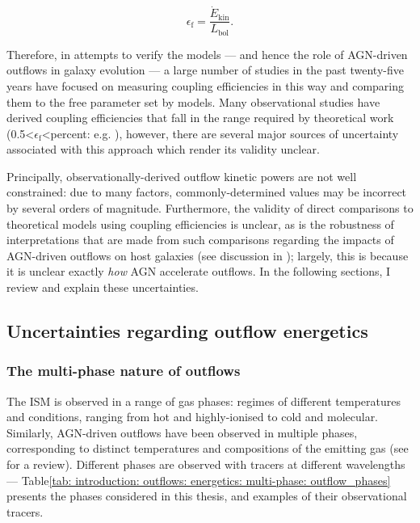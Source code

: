 \begin{equation}
    \epsilon_\mathrm{f}=\frac{\dot{E}_\mathrm{kin}}{L_\mathrm{bol}}.
    \label{eq: introduction: outflows: introduction: e_f}
\end{equation}

Therefore, in attempts to verify the models --- and hence the role of AGN-driven outflows in galaxy evolution --- a large number of studies in the past twenty-five years have focused on measuring coupling efficiencies in this way and comparing them to the free parameter set by models. Many observational studies have derived coupling efficiencies that fall in the range required by theoretical work (0.5\;\textless\;$\epsilon_\mathrm{f}$\;\textless{}\;per\;cent: e.g. \citealt{Liu2013, Harrison2014, Cicone2014, Fiore2017}), however, there are several major sources of uncertainty associated with this approach which render its validity unclear.

Principally, observationally-derived outflow kinetic powers are not well constrained: due to many factors, commonly-determined values may be incorrect by several orders of magnitude. Furthermore, the validity of direct comparisons to theoretical models using coupling efficiencies is unclear, as is the robustness of interpretations that are made from such comparisons regarding the impacts of AGN-driven outflows on host galaxies (see discussion in \citealt{Harrison2018}); largely, this is because it is unclear exactly \textit{how} AGN accelerate outflows. In the following sections, I review and explain these uncertainties.

\subsection{Uncertainties regarding outflow energetics}
\label{section: introduction: outflows: energetics}

\subsubsection{The multi-phase nature of outflows}
\label{section: introduction: outflows: energetics: multi-phase}

The ISM is observed in a range of gas phases: regimes of different temperatures and conditions, ranging from hot and highly-ionised to cold and molecular. Similarly, AGN-driven outflows have been observed in multiple phases, corresponding to distinct temperatures and compositions of the emitting gas (see \citealt{Cicone2018} for a review). Different phases are observed with tracers at different wavelengths --- Table\;\ref{tab: introduction: outflows: energetics: multi-phase: outflow_phases} presents the phases considered in this thesis, and examples of their observational tracers.

